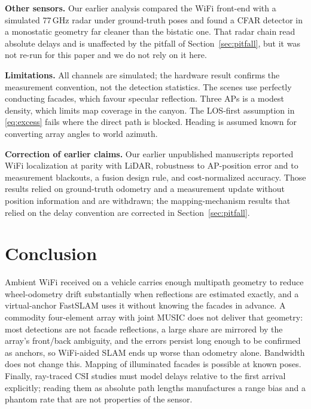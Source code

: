 \documentclass[preprint,12pt]{elsarticle}
\begin{document}
\textbf{Other sensors.} Our earlier analysis compared the WiFi front-end with a simulated 77\,GHz
radar under ground-truth poses and found a CFAR detector in a monostatic geometry far cleaner than
the bistatic one. That radar chain read absolute delays and is unaffected by the pitfall of
Section~\ref{sec:pitfall}, but it was not re-run for this paper and we do not rely on it here.

\textbf{Limitations.} All channels are simulated; the hardware result confirms the measurement
convention, not the detection statistics. The scenes use perfectly conducting facades, which
favour specular reflection. Three APs is a modest density, which limits map coverage in the
canyon. The LOS-first assumption in \eqref{eq:excess} fails where the direct path is blocked.
Heading is assumed known for converting array angles to world azimuth.

\textbf{Correction of earlier claims.} Our earlier unpublished manuscripts reported WiFi
localization at parity with LiDAR, robustness to AP-position error and to measurement blackouts,
a fusion design rule, and cost-normalized accuracy. Those results relied on ground-truth odometry
and a measurement update without position information and are withdrawn; the mapping-mechanism
results that relied on the delay convention are corrected in Section~\ref{sec:pitfall}.

\section{Conclusion}\label{sec:conclusion}

Ambient WiFi received on a vehicle carries enough multipath geometry to reduce wheel-odometry
drift substantially when reflections are estimated exactly, and a virtual-anchor FastSLAM uses it
without knowing the facades in advance. A commodity four-element array with joint MUSIC does not
deliver that geometry: most detections are not facade reflections, a large share are mirrored by
the array's front/back ambiguity, and the errors persist long enough to be confirmed as anchors,
so WiFi-aided SLAM ends up worse than odometry alone. Bandwidth does not change this. Mapping of
illuminated facades is possible at known poses. Finally, ray-traced CSI studies must model delays
relative to the first arrival explicitly; reading them as absolute path lengths manufactures a
range bias and a phantom rate that are not properties of the sensor.
\end{document}
